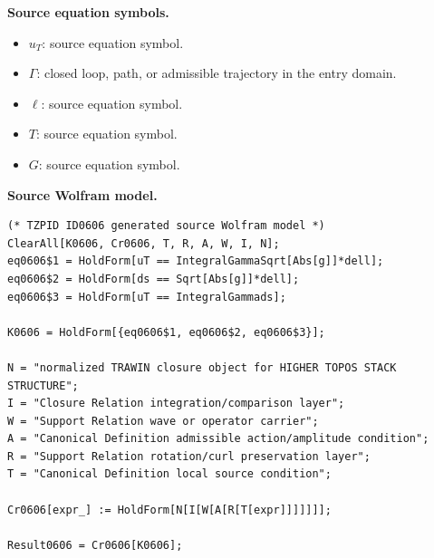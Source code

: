 \begin{minipage}[t]{0.49\linewidth}
\begingroup
\small
\raggedright
\textbf{Source equation symbols.}\par
\begin{itemize}[leftmargin=1.35em,itemsep=1pt,topsep=1pt,parsep=0pt]
    \item $u_T$: source equation symbol.
    \item $\Gamma$: closed loop, path, or admissible trajectory in the entry domain.
    \item $\ell$: source equation symbol.
    \item $T$: source equation symbol.
    \item $G$: source equation symbol.
\end{itemize}
\endgroup
\end{minipage}\hfill
\begin{minipage}[t]{0.47\linewidth}
\begingroup
\scriptsize
\raggedright
\textbf{Source Wolfram model.}\par
\begin{Verbatim}[fontsize=\tiny,breaklines=true,breakanywhere=true]
(* TZPID ID0606 generated source Wolfram model *)
ClearAll[K0606, Cr0606, T, R, A, W, I, N];
eq0606$1 = HoldForm[uT == IntegralGammaSqrt[Abs[g]]*dell];
eq0606$2 = HoldForm[ds == Sqrt[Abs[g]]*dell];
eq0606$3 = HoldForm[uT == IntegralGammads];

K0606 = HoldForm[{eq0606$1, eq0606$2, eq0606$3}];

N = "normalized TRAWIN closure object for HIGHER TOPOS STACK STRUCTURE";
I = "Closure Relation integration/comparison layer";
W = "Support Relation wave or operator carrier";
A = "Canonical Definition admissible action/amplitude condition";
R = "Support Relation rotation/curl preservation layer";
T = "Canonical Definition local source condition";

Cr0606[expr_] := HoldForm[N[I[W[A[R[T[expr]]]]]]];

Result0606 = Cr0606[K0606];
\end{Verbatim}
\endgroup
\end{minipage}

